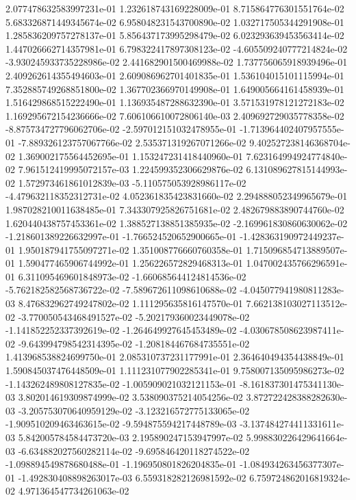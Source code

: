 2.077478632583997231e-01
1.232618743169228009e-01
8.715864776301551764e-02
5.683326871449345674e-02
6.958048231543700890e-02
1.032717505344291908e-01
1.285836209757278137e-01
5.856437173995298479e-02
6.023293639453563414e-02
1.447026662714357981e-01
6.798322417897308123e-02
-4.605509240777214824e-02
-3.930245933735228986e-02
2.441682901500469988e-02
1.737756065918939496e-01
2.409262614355494603e-01
2.609086962701401835e-01
1.536104015101115994e-01
7.352885749268851800e-02
1.367702366970149908e-01
1.649005664161458939e-01
1.516429868515222490e-01
1.136935487288632390e-01
3.571531978121272183e-02
1.169295672154236666e-02
7.606106610072806140e-03
2.409692729035778358e-02
-8.875734727796062706e-02
-2.597012151032478955e-01
-1.713964402407957555e-01
-7.889326123757067766e-02
2.535371319267071266e-02
9.402527238146368704e-02
1.369002175564452695e-01
1.153247231418440960e-01
7.623164994924774840e-02
7.961512419995072157e-03
1.224599352306629876e-02
6.131089627815144993e-02
1.572973461861012839e-03
-5.110575053928986117e-02
-4.479632118352312731e-02
4.052361835423831660e-02
2.294888052349965679e-01
1.987028210011638485e-01
7.343307925826751681e-02
2.482679883890744760e-02
1.620440438757453361e-02
1.388527138851385935e-02
-2.169961830860630062e-02
-1.218601389226632997e-01
-1.766524520652900665e-01
-1.428363190972449237e-01
1.950187941755097271e-02
1.351008776660760358e-01
1.715096854713889507e-01
1.590477465906744992e-01
1.256226572829468313e-01
1.047002435766296591e-01
6.311095469601848973e-02
-1.660685644124814536e-02
-5.762182582568736722e-02
-7.589672611098610688e-02
-4.045077941980811283e-03
8.476832962749247802e-02
1.111295635816147570e-01
7.662138103027113512e-02
-3.770050543468491527e-02
-5.202179360023449078e-02
-1.141852252337392619e-02
-1.264649927645453489e-02
-4.030678508623987411e-02
-9.643994798542314395e-02
-1.208184467684735551e-02
1.413968538824699750e-01
2.085310737231177991e-01
2.364640494354438849e-01
1.590845037476448509e-01
1.111231077902285341e-01
9.758007135095986273e-02
-1.143262489808127835e-02
-1.005909021032121153e-01
-8.161837301475341130e-03
3.802014619309874999e-02
3.538090375214054256e-02
3.872722428388282630e-03
-3.205753070640959129e-02
-3.123216572775133065e-02
-1.909510209463463615e-02
-9.594875594217448789e-03
-3.137484274411331611e-03
5.842005784584473720e-03
2.195890247153947997e-02
5.998830226429641664e-03
-6.634882027560282114e-02
-9.695846420118274522e-02
-1.098894549878680488e-01
-1.196950801826204835e-01
-1.084934263456377307e-01
-1.492830408898263017e-03
6.559318282126981592e-02
6.759724862016819324e-02
4.971364547734261063e-02
